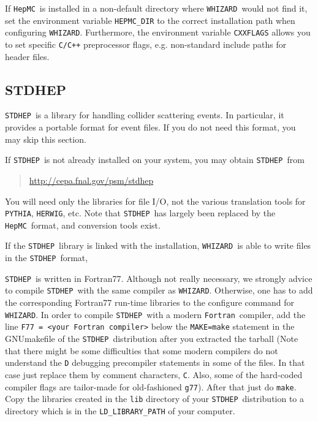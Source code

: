 \documentclass[12pt]{book}
\newcommand{\ttt}[1]{\texttt{#1}}
\newcommand{\whizard}{\texttt{WHIZARD}}
\newcommand{\herwig}{\texttt{HERWIG}}
\newcommand{\pythia}{\texttt{PYTHIA}}
\newcommand{\stdhep}{\texttt{STDHEP}}
\newcommand{\hepmc}{\texttt{HepMC}}
\newcommand{\fortran}{\texttt{Fortran}}
\begin{document}
If \hepmc\ is installed in a non-default directory where \whizard\
would not find it, set the environment variable \ttt{HEPMC\_DIR} to
the correct installation path when configuring \whizard.  Furthermore,
the environment variable \ttt{CXXFLAGS} allows you to set specific
\ttt{C/C++} preprocessor flags, e.g. non-standard include paths for
header files.



\subsection{STDHEP}
\label{sec:stdhep}

\stdhep\ is a  library for handling collider scattering
events.  In particular, it provides a portable format for event
files.  If you do not need this format, you may skip this section.

If \stdhep\ is not already installed on your system, you may obtain
\stdhep\ from
\begin{quote}
  \url{http://cepa.fnal.gov/psm/stdhep}
\end{quote}
You will need only the libraries for file I/O, not the various
translation tools for \pythia, \herwig, etc.  Note that \stdhep\ has
largely been replaced by the \hepmc\ format, and conversion tools exist.

If the \stdhep\ library is linked with the installation, \whizard\ is
able to write files in the \stdhep\ format,

\stdhep\ is written in Fortran77. Although not really necessary, we
strongly advice to compile \stdhep\ with the same compiler as
\whizard. Otherwise, one has to add the corresponding Fortran77
run-time libraries to the configure command for \whizard. In order to
compile \stdhep\ with a modern \fortran\ compiler, add the line
\ttt{F77 = <your Fortran compiler>} below the \ttt{MAKE=make}
statement in the GNUmakefile of the \stdhep\ distribution after you
extracted the tarball (Note that there might be some difficulties that
some modern compilers do not understand the \ttt{D} debugging
precompiler statements in some of the files. In that case just replace
them by comment characters, \ttt{C}. Also, some of the hard-coded
compiler flags are tailor-made for old-fashioned \ttt{g77}). After
that just do \ttt{make}. Copy the libraries created in the \ttt{lib}
directory of your \stdhep\ distribution to a directory which is in the
\ttt{LD\_LIBRARY\_PATH} of your computer.
\end{document}
